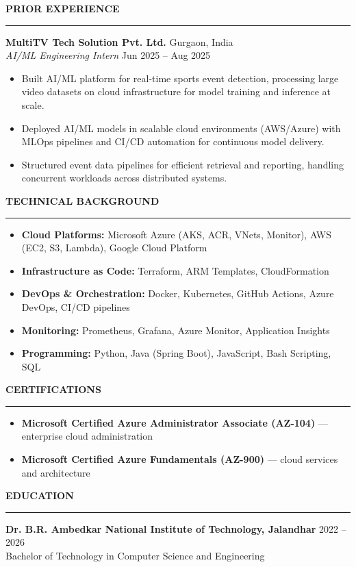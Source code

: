 \documentclass[a4paper,10pt]{article}
\newcommand{\cvsection}[1]{%
  \vspace{2mm}
  \noindent\textbf{\large\MakeUppercase{#1}}
  \vspace{1mm}
  \hrule
  \vspace{1.5mm}
}
\begin{document}
\cvsection{Prior Experience}
\textbf{MultiTV Tech Solution Pvt. Ltd.} \hfill Gurgaon, India \\
\textit{AI/ML Engineering Intern} \hfill Jun 2025 -- Aug 2025
\begin{itemize}
    \item Built AI/ML platform for real-time sports event detection, processing large video datasets on cloud infrastructure for model training and inference at scale.
    \item Deployed AI/ML models in scalable cloud environments (AWS/Azure) with MLOps pipelines and CI/CD automation for continuous model delivery.
    \item Structured event data pipelines for efficient retrieval and reporting, handling concurrent workloads across distributed systems.
\end{itemize}

\cvsection{Technical Background}
\begin{itemize}[itemsep=0.5mm]
    \item \textbf{Cloud Platforms:} Microsoft Azure (AKS, ACR, VNets, Monitor), AWS (EC2, S3, Lambda), Google Cloud Platform
    \item \textbf{Infrastructure as Code:} Terraform, ARM Templates, CloudFormation
    \item \textbf{DevOps \& Orchestration:} Docker, Kubernetes, GitHub Actions, Azure DevOps, CI/CD pipelines
    \item \textbf{Monitoring:} Prometheus, Grafana, Azure Monitor, Application Insights
    \item \textbf{Programming:} Python, Java (Spring Boot), JavaScript, Bash Scripting, SQL
\end{itemize}

\cvsection{Certifications}
\begin{itemize}[itemsep=0.5mm]
    \item \textbf{Microsoft Certified Azure Administrator Associate (AZ-104)} --- enterprise cloud administration
    \item \textbf{Microsoft Certified Azure Fundamentals (AZ-900)} --- cloud services and architecture
\end{itemize}

\cvsection{Education}
\textbf{Dr. B.R. Ambedkar National Institute of Technology, Jalandhar} \hfill 2022 -- 2026 \\
Bachelor of Technology in Computer Science and Engineering
\end{document}
